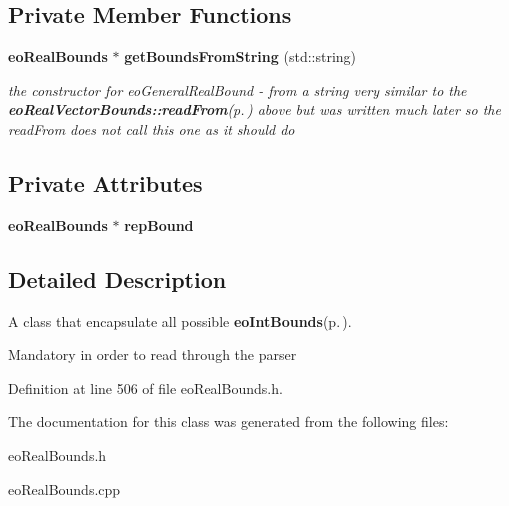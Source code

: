\subsection*{Private Member Functions}
\begin{CompactItemize}
\item 
{\bf eo\-Real\-Bounds} $\ast$ {\bf get\-Bounds\-From\-String} (std::string)\label{classeo_general_real_bounds_d0}

\begin{CompactList}\small\item\em the constructor for eo\-General\-Real\-Bound - from a string very similar to the {\bf eo\-Real\-Vector\-Bounds::read\-From}{\rm (p.\,\pageref{classeo_real_vector_bounds_a7})} above but was written much later so the read\-From does not call this one as it should do \item\end{CompactList}\end{CompactItemize}
\subsection*{Private Attributes}
\begin{CompactItemize}
\item 
{\bf eo\-Real\-Bounds} $\ast$ {\bf rep\-Bound}\label{classeo_general_real_bounds_r0}

\end{CompactItemize}


\subsection{Detailed Description}
A class that encapsulate all possible {\bf eo\-Int\-Bounds}{\rm (p.\,\pageref{classeo_int_bounds})}. 

Mandatory in order to read through the parser 



Definition at line 506 of file eo\-Real\-Bounds.h.

The documentation for this class was generated from the following files:\begin{CompactItemize}
\item 
eo\-Real\-Bounds.h\item 
eo\-Real\-Bounds.cpp\end{CompactItemize}
